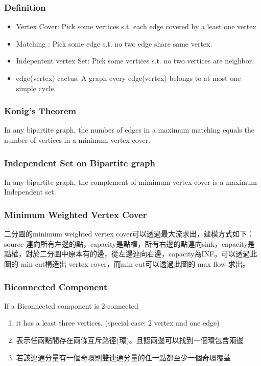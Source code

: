 \subsubsection{Definition}
\begin{itemize}
	\setlength\itemsep{-0.5em}
	\item Vertex Cover: Pick some vertices s.t. each edge covered by a least one vertex
	\item Matching : Pick some edge s.t. no two edge share same vertex.
	\item Indepentent vertex Set: Pick some vertices s.t. no two vertices are neighbor.
	\item edge(vertex) cactus: A graph every edge(vertex) belongs to at most one simple cycle.
\end{itemize}


\subsubsection{Konig's Theorem}

In any bipartite graph, the number of edges in a maximum matching equals the number of vertices in a minimum vertex cover.

\subsubsection{Independent Set on Bipartite graph}

In any bipartite graph, the complement of mimimum vertex cover is a maximum Independent set.

\subsubsection{Minimum Weighted Vertex Cover}

二分圖的minimum weighted vertex cover可以透過最大流求出，建模方式如下：source 連向所有左邊的點，capacity是點權，所有右邊的點連向sink，capacity是點權，對於二分圖中原本有的邊，從左邊連向右邊，capacity為INF。可以透過此圖的 min cut構造出 vertex cover，而min cut可以透過此圖的 max flow 求出。

\subsubsection{Biconnected Component}
If a Biconnected component is 2-connected
\begin{enumerate}
	\setlength\itemsep{-0.5em}
	\item it has a least three vertices. (special case: 2 vertex and one edge)
	\item 表示任兩點間存在兩條互斥路徑(環)。且認兩邊可以找到一個環包含兩邊
	\item 若該連通分量有一個奇環則雙連通分量的任一點都至少一個奇環覆蓋
\end{enumerate}
